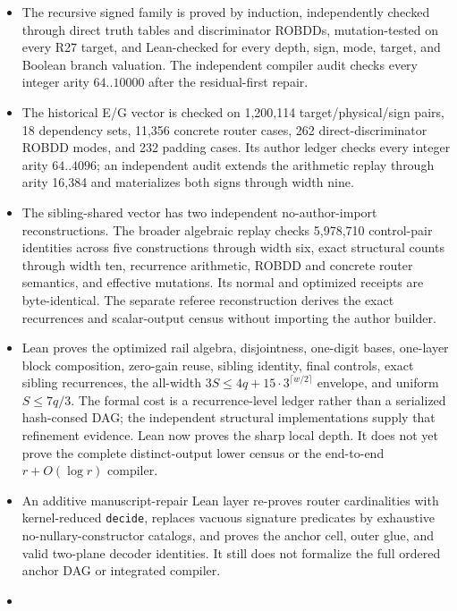 \documentclass[
  11pt,
]{article}
\newcommand{\passthrough}[1]{#1}
\theoremstyle{definition}
\theoremstyle{remark}
\begin{document}
\begin{itemize}
  recurrence checked through 256 points and structural depth arithmetic
  through arity 4,096.
\item
  The recursive signed family is proved by induction, independently
  checked through direct truth tables and discriminator ROBDDs,
  mutation-tested on every R27 target, and Lean-checked for every depth,
  sign, mode, target, and Boolean branch valuation. The independent
  compiler audit checks every integer arity \(64..10000\) after the
  residual-first repair.
\item
  The historical E/G vector is checked on 1,200,114 target/physical/sign
  pairs, 18 dependency sets, 11,356 concrete router cases, 262
  direct-discriminator ROBDD modes, and 232 padding cases. Its author
  ledger checks every integer arity \(64..4096\); an independent audit
  extends the arithmetic replay through arity 16,384 and materializes
  both signs through width nine.
\item
  The sibling-shared vector has two independent no-author-import
  reconstructions. The broader algebraic replay checks 5,978,710
  control-pair identities across five constructions through width six,
  exact structural counts through width ten, recurrence arithmetic,
  ROBDD and concrete router semantics, and effective mutations. Its
  normal and optimized receipts are byte-identical. The separate referee
  reconstruction derives the exact recurrences and scalar-output census
  without importing the author builder.
\item
  Lean proves the optimized rail algebra, disjointness, one-digit bases,
  one-layer block composition, zero-gain reuse, sibling identity, final
  controls, exact sibling recurrences, the all-width
  \(3S\le 4q+15\mathbin{\cdot}3^{\lceil w/2 \rceil}\) envelope, and
  uniform \(S\le 7q/3\). The formal cost is a recurrence-level ledger
  rather than a serialized hash-consed DAG; the independent structural
  implementations supply that refinement evidence. Lean now proves the
  sharp local depth. It does not yet prove the complete distinct-output
  lower census or the end-to-end \(r+O(\log r)\) compiler.
\item
  An additive manuscript-repair Lean layer re-proves router
  cardinalities with kernel-reduced \passthrough{\lstinline!decide!},
  replaces vacuous signature predicates by exhaustive
  no-nullary-constructor catalogs, and proves the anchor cell, outer
  glue, and valid two-plane decoder identities. It still does not
  formalize the full ordered anchor DAG or integrated compiler.
\item

\end{itemize}
\end{document}
